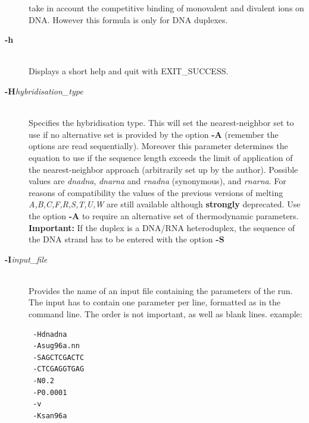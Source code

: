 \documentclass{article}
\begin{document}
\begin{description}
  take in account the competitive binding of monovalent and divalent ions on DNA. 
  However this formula is only for DNA duplexes.
\item [\textbf{-h}]\mbox{}\\ 
Displays a short help and quit with EXIT\_SUCCESS. 
\item [\textbf{-H}\textit{hybridisation\_type}]\mbox{}\\
  Specifies the hybridisation type. This will set the nearest-neighbor set to
  use if no alternative set is provided by the option \textbf{-A} (remember the
  options are read sequentially). Moreover this parameter determines the
  equation to use if the sequence length exceeds the limit of application of the
  nearest-neighbor approach (arbitrarily set up by the author). Possible values
  are \textit{dnadna}, \textit{dnarna} and \textit{rnadna} (synonymous), and
  \textit{rnarna}. For reasons of compatibility the values of the previous
  versions of melting \textit{A,B,C,F,R,S,T,U,W} are still available although
  \textbf{strongly } deprecated. Use the option \textbf{-A} to require an
  alternative set of thermodynamic parameters. \textbf{Important:} If the duplex
  is a DNA/RNA heteroduplex, the sequence of the DNA strand has to be entered
  with the option \textbf{-S}
\item [\textbf{-I}\textit{input\_file}  ]\mbox{}\\ 
Provides the name of an input file containing the parameters of the
run. The input has to contain one parameter per line, formatted as in
the command line. The order  is not important, as well as blank lines.
example:   

\begin{verbatim}
 -Hdnadna  
 -Asug96a.nn
 -SAGCTCGACTC
 -CTCGAGGTGAG
 -N0.2
 -P0.0001 
 -v 
 -Ksan96a 

\end{verbatim}


\end{description}
\end{document}
